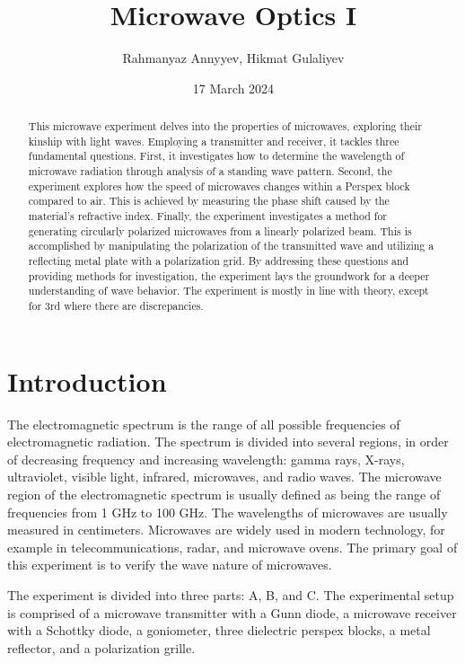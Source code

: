 \documentclass[10pt]{article}
\title{Microwave Optics I}
\author{Rahmanyaz Annyyev, Hikmat Gulaliyev}
\date{17 March 2024}
\begin{document}
\maketitle

\begin{abstract}
  This microwave experiment delves into the properties of microwaves, exploring their kinship with light waves. Employing a transmitter and receiver, it tackles three fundamental questions. First, it investigates how to determine the wavelength of microwave radiation through analysis of a standing wave pattern. Second, the experiment explores how the speed of microwaves changes within a Perspex block compared to air. This is achieved by measuring the phase shift caused by the material's refractive index. Finally, the experiment investigates a method for generating circularly polarized microwaves from a linearly polarized beam. This is accomplished by manipulating the polarization of the transmitted wave and utilizing a reflecting metal plate with a polarization grid. By addressing these questions and providing methods for investigation, the experiment lays the groundwork for a deeper understanding of wave behavior. The experiment is mostly in line with theory, except for 3rd where there are discrepancies.
\end{abstract}

\section{Introduction}

The electromagnetic spectrum is the range of all possible frequencies of electromagnetic radiation. The spectrum is divided into several regions, in order of decreasing frequency and increasing wavelength: gamma rays, X-rays, ultraviolet, visible light, infrared, microwaves, and radio waves. The microwave region of the electromagnetic spectrum is usually defined as being the range of frequencies from 1 GHz to 100 GHz. The wavelengths of microwaves are usually measured in centimeters. Microwaves are widely used in modern technology, for example in telecommunications, radar, and microwave ovens. The primary goal of this experiment is to verify the wave nature of microwaves.

The experiment is divided into three parts: A, B, and C. The experimental setup is comprised of a microwave transmitter with a Gunn diode, a microwave receiver with a Schottky diode, a goniometer, three dielectric perspex blocks, a metal reflector, and a polarization grille.
\end{document}
